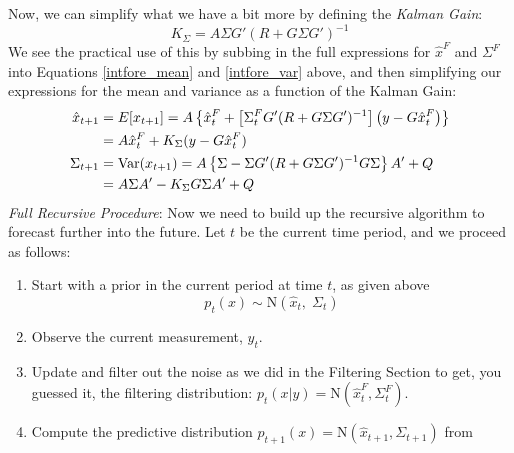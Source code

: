 \documentclass[a4paper,12pt]{article}
\begin{document}
\newpage
Now, we can simplify what we have a bit more by defining 
the \emph{Kalman Gain}:
\begin{equation}
    \label{kalgain}
    K_\Sigma = A\Sigma G' (R + G\Sigma G')^{-1}
\end{equation}
We see the practical use of this by subbing in the full
expressions for $\hat{x}^F$ and $\Sigma^F$ into Equations 
\ref{intfore_mean} and \ref{intfore_var} above,
and then simplifying our expressions for the
mean and variance as a function of the Kalman Gain:
\begin{align}
    \hat{x}_{t+1} &= E[x_{t+1}] = 
        A\left\{ \hat{x}^F_t
	    + \left[\Sigma^F_t G' (R + G \Sigma G')^{-1}  \right]
        \left( y - G \hat{x}^F_t \right) \right\} \notag \\
        &= A\hat{x}^F_t + K_\Sigma (y - G \hat{x}^F_t) 
        \label{foremean} \\
    \Sigma_{t+1} &= \text{Var}(x_{t+1}) = 
        A \left\{ \Sigma - \Sigma G'(R 
	    + G\Sigma G')^{-1}
        G\Sigma \right\} A' + Q \notag \\
    &= A\Sigma A' - K_\Sigma G \Sigma A' + Q
        \label{forevar}
\end{align}
{\sl Full Recursive Procedure}:
Now we need to build up the recursive algorithm to forecast 
further into the future. Let $t$ be the current time period, 
and we proceed as follows:
\begin{enumerate}
    \item Start with a prior in the current period at 
        time $t$, as given above
        \[ p_{t}(x) \sim \text{N}\left(\hat{x}_t, \; 
            \Sigma_t\right) \]
    \item Observe the current measurement, $y_t$.
    \item Update and filter out the noise as we did in
        the Filtering Section to get, you guessed it,
        the filtering distribution: $p_t(x | y) = 
        \text{N}(\hat{x}^F_t, \Sigma^F_t)$.
    \item Compute the predictive distribution 
        $p_{t+1}(x) = \text{N}(\hat{x}_{t+1}, \Sigma_{t+1})$
        from

\end{enumerate}











\end{document}
